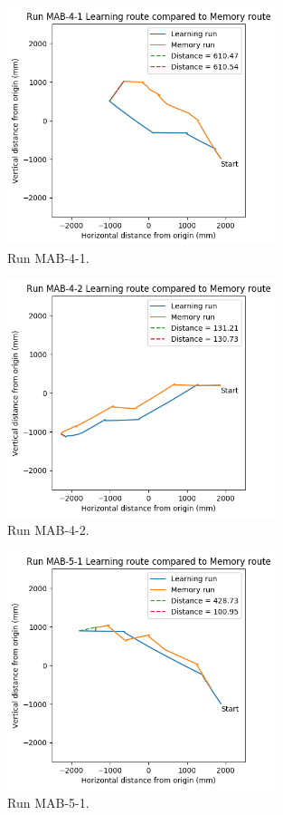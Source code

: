 \documentclass[a4paper,11pt,twoside,openright]{article}
\begin{document}
\begin{figure}[h!]
 \centering
  \includegraphics[width=0.7\textwidth]{MAB-4-1}
  \caption{
    \label{fig:mab-4-1} Run MAB-4-1.
  }
\end{figure}

\begin{figure}[h!]
 \centering
  \includegraphics[width=0.7\textwidth]{MAB-4-2}
  \caption{
    \label{fig:mab-4-2} Run MAB-4-2.
  }
\end{figure}

\begin{figure}[h!]
 \centering
  \includegraphics[width=0.7\textwidth]{MAB-5-1}
  \caption{
    \label{fig:mab-5-1} Run MAB-5-1.
  }
\end{figure}
\end{document}
